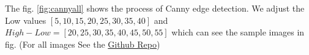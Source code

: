 \documentclass[final]{cvpr}
\begin{document}
\begin{appendices}
The fig. \ref{fig:cannyall} shows the process of Canny edge detection. We adjust the Low values $[5,10,15,20,25,30,35,40]$ and $High-Low=[20,25,30,35,40,45,50,55]$ which can see the sample images in fig. (For all images See the \href{https://github.com/Arctic-Xiangjian/assignment2/tree/main/findbestcanny}{Github Repo})
\begin{figure}[h]
  \centering
  \quad
  \quad
  \quad
  \quad
  \quad
\end{figure}
\end{appendices}
\end{document}

